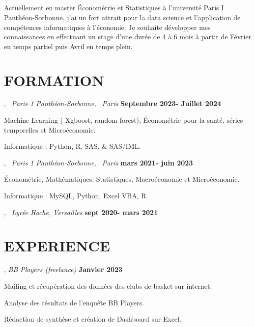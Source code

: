 \documentclass[letter,11pt]{article}
\begin{document}
\subsection{}
Actuellement en master Économétrie et Statistiques à l’université Paris I Panthéon-Sorbonne, j’ai un fort attrait pour la data science et l’application de compétences informatiques à l’économie. Je souhaite développer mes connaissances en effectuant un stage d’une durée de 4 à 6 mois à partir de Février en temps partiel puis Avril en temps plein. 


\section{FORMATION}
, \ \textit{Paris 1 Panthéon-Sorbonne, \ Paris} \hfill\textbf{Septembre 2023- Juillet 2024} 
\vspace{-10pt}
\begin{zitemize}
\item Machine Learning ( Xgboost, random forest), Économétrie pour la santé, séries temporelles et Microéconomie.
\item Informatique : Python, R, SAS, & SAS/IML.

\end{zitemize}
, \ \textit{Paris 1 Panthéon-Sorbonne, \ Paris} \hfill\textbf{mars 2021- juin 2023} 
\vspace{-10pt}
\begin{zitemize}
\item Économétrie, Mathématiques, Statistiques, Macroéconomie et Microéconomie.
\item Informatique : MySQL, Python, Excel VBA, R.
 
\end{zitemize}
\vspace{-2pt}
, \ \textit{Lycée Hoche, Versailles} \hfill\textbf{sept 2020- mars 2021}
\\

\section{EXPERIENCE} 
, \textit{BB Players (freelance)} \hfill\textbf{Janvier 2023}
\vspace{-5pt}
\begin{zitemize}
\item Mailing et récupération des données des clubs de basket sur internet. 
\item Analyse des résultats de l'enquête BB Players.
\item Rédaction de synthèse et création de Dashboard sur Excel.
\end{zitemize}
\end{document}
